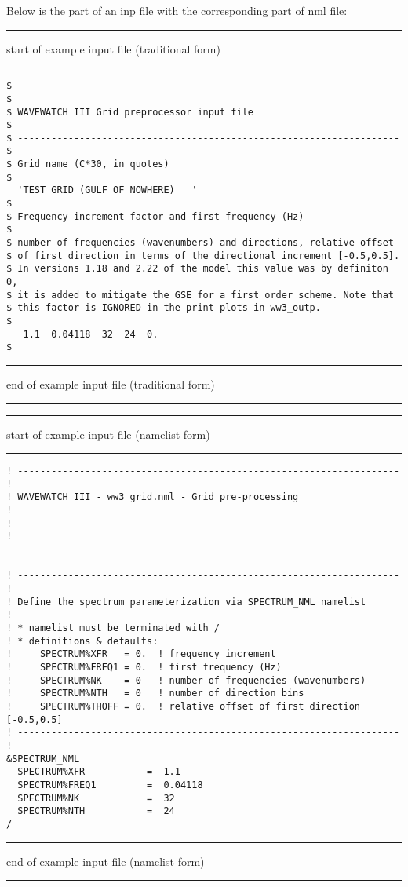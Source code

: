 \vspace{\baselineskip} \noindent
Below is the part of an {\file inp} file with the corresponding part of {\file nml} file:

\vspace{\baselineskip} \noindent
\rule[1mm]{43mm}{.5mm} {\rm start of example input file (traditional form)}
\rule[1mm]{43mm}{.5mm}
\begin{footnotesize}
\begin{verbatim}
$ -------------------------------------------------------------------- $
$ WAVEWATCH III Grid preprocessor input file                           $
$ -------------------------------------------------------------------- $
$ Grid name (C*30, in quotes)
$
  'TEST GRID (GULF OF NOWHERE)   '
$
$ Frequency increment factor and first frequency (Hz) ---------------- $
$ number of frequencies (wavenumbers) and directions, relative offset
$ of first direction in terms of the directional increment [-0.5,0.5].
$ In versions 1.18 and 2.22 of the model this value was by definiton 0,
$ it is added to mitigate the GSE for a first order scheme. Note that
$ this factor is IGNORED in the print plots in ww3_outp.
$
   1.1  0.04118  32  24  0.
$
\end{verbatim}
\end{footnotesize}
\rule[1mm]{46mm}{.5mm} end of example input file (traditional form) 
\rule[1mm]{45.1mm}{.5mm}

\vspace{\baselineskip} \noindent
\rule[1mm]{43mm}{.5mm} {\rm start of example input file (namelist form)}
\rule[1mm]{43mm}{.5mm}
\begin{footnotesize}
\begin{verbatim}
! -------------------------------------------------------------------- !
! WAVEWATCH III - ww3_grid.nml - Grid pre-processing                   !
! -------------------------------------------------------------------- !


! -------------------------------------------------------------------- !
! Define the spectrum parameterization via SPECTRUM_NML namelist
!
! * namelist must be terminated with /
! * definitions & defaults:
!     SPECTRUM%XFR   = 0.  ! frequency increment
!     SPECTRUM%FREQ1 = 0.  ! first frequency (Hz)
!     SPECTRUM%NK    = 0   ! number of frequencies (wavenumbers)
!     SPECTRUM%NTH   = 0   ! number of direction bins
!     SPECTRUM%THOFF = 0.  ! relative offset of first direction [-0.5,0.5]
! -------------------------------------------------------------------- !
&SPECTRUM_NML
  SPECTRUM%XFR           =  1.1
  SPECTRUM%FREQ1         =  0.04118
  SPECTRUM%NK            =  32
  SPECTRUM%NTH           =  24
/
\end{verbatim}
\end{footnotesize}
\rule[1mm]{46mm}{.5mm} end of example input file (namelist form) 
\rule[1mm]{45.1mm}{.5mm}



\pb
